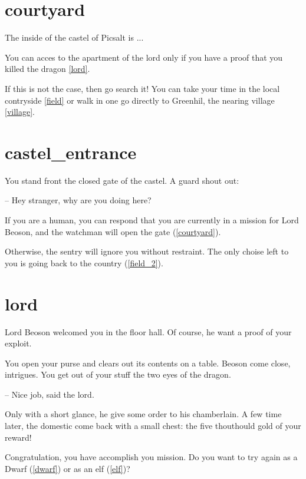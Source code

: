 \section{courtyard}

The inside of the castel of Picsalt is ...

You can acces to the apartment of the lord only if you have a proof that you
killed the dragon \ref{lord}.

If this is not the case, then go search it! You can take your time in the local
contryside \ref{field} or walk in one go directly to Greenhil, the nearing
village \ref{village}.

\section{castel_entrance}

You stand front the closed gate of the castel. A guard shout out:

-- Hey stranger, why are you doing here?

If you are a human, you can respond that you are currently in a mission for Lord
Beoson, and the watchman will open the gate (\ref{courtyard}).

Otherwise, the sentry will ignore you without restraint. The only choise
left to you is going back to the country (\ref{field_2}).

\section{lord}

Lord Beoson welcomed you in the floor hall. Of course, he want a proof of your
exploit.

You open your purse and clears out its contents on a table. Beoson come close,
intrigues. You get out of your stuff the two eyes of the dragon.

-- Nice job, said the lord.

Only with a short glance, he give some order to his chamberlain. A few time
later, the domestic come back with a small chest: the five thouthould gold of
your reward!

Congratulation, you have accomplish you mission. Do you want to try again as a
Dwarf (\ref{dwarf}) or as an elf (\ref{elf})?
